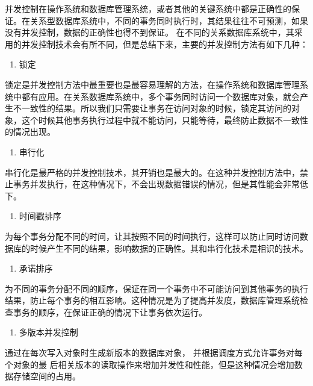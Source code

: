 并发控制在操作系统和数据库管理系统，或者其他的关键系统中都是正确性的保证。在关系型数据库系统中，不同的事务同时执行时，其结果往往不可预测，如果没有并发控制，数据的正确性也得不到保证。
在不同的关系数据库系统中，其采用的并发控制技术会有所不同，但是总结下来，主要的并发控制方法有如下几种：

	\begin{enumerate}
		\item 锁定
	\end{enumerate}


  锁定是并发控制方法中最重要也是最容易理解的方法，在操作系统和数据库管理系统中都有应用。在关系数据库系统中，多个事务同时访问一个数据库对象，就会产生不一致性的结果。所以我们只需要让事务在访问对象的时候，锁定其访问的对象，这个时候其他事务执行过程中就不能访问，只能等待，最终防止数据不一致性的情况出现。
	
	\begin{enumerate}[resume]
		\item 串行化
	\end{enumerate}

 串行化是最严格的并发控制技术，其开销也是最大的。在这种并发控制方法中，禁止事务并发执行，在这种情况下，不会出现数据错误的情况，但是其性能会非常低下。
 
 \begin{enumerate}[resume]
 	\item 时间戳排序
 \end{enumerate}

  为每个事务分配不同的时间，让其按照不同的时间执行，这样可以防止同时访问数据库的时候产生不同的结果，影响数据的正确性。其和串行化技术是相识的技术。
   
    \begin{enumerate}[resume]
   	\item 承诺排序
   \end{enumerate}

 为不同的事务分配不同的顺序，保证在同一个事务中不可能访问到其他事务的执行结果，防止每个事务的相互影响。这种情况是为了提高并发度，数据库管理系统检查事务的顺序，在保证正确的情况下让事务依次运行。
 
\begin{enumerate}[resume]
	\item 多版本并发控制
\end{enumerate}

通过在每次写入对象时生成新版本的数据库对象，
	并根据调度方式允许事务对每个对象的最
	后相关版本的读取操作来增加并发性和性能，但是这种情况会增加数据存储空间的占用。
	
